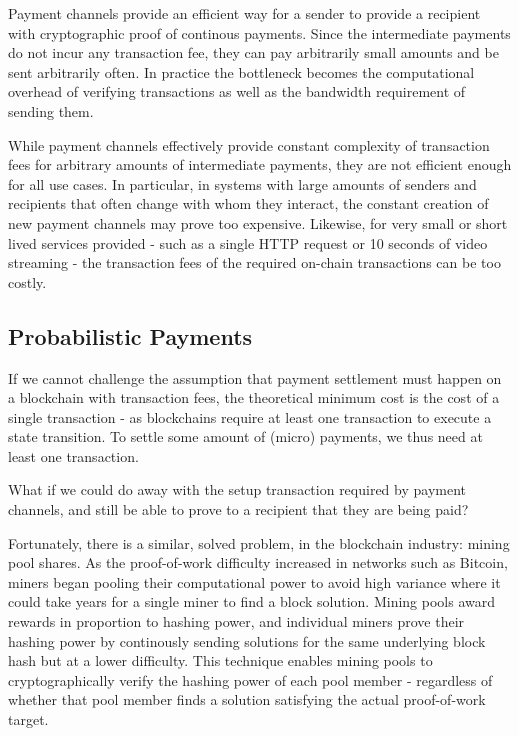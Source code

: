 Payment channels provide an efficient way for a sender to provide a recipient with cryptographic proof of continous payments. Since the intermediate payments do not incur any transaction fee, they can pay arbitrarily small amounts and be sent arbitrarily often. In practice the bottleneck becomes the computational overhead of verifying transactions as well as the bandwidth requirement of sending them.

While payment channels effectively provide constant complexity of transaction fees for arbitrary amounts of intermediate payments, they are not efficient enough for all use cases. In particular, in systems  with large amounts of senders and recipients that often change with whom they interact, the constant creation of new payment channels may prove too expensive. Likewise, for very small or short lived services provided - such as a single HTTP request or 10 seconds of video streaming - the transaction fees of the required on-chain transactions can be too costly.

\subsection{Probabilistic Payments}

If we cannot challenge the assumption that payment settlement must happen on a blockchain with transaction fees, the theoretical minimum cost is the cost of a single transaction - as blockchains require at least one transaction to execute a state transition. To settle some amount of (micro) payments, we thus need at least one transaction.

What if we could do away with the setup transaction required by payment channels, and still be able to prove to a recipient that they are being paid?

Fortunately, there is a similar, solved problem, in the blockchain industry: mining pool shares\cite{MiningPoolMethods}. As the proof-of-work difficulty increased in networks such as Bitcoin, miners began pooling their computational power to avoid high variance where it could take years for a single miner to find a block solution. Mining pools award rewards in proportion to hashing power, and individual miners prove their hashing power by continously sending solutions\cite{MiningPoolShares} for the same underlying block hash but at a lower difficulty. This technique enables mining pools to cryptographically verify the hashing power of each pool member - regardless of whether that pool member finds a solution satisfying the actual proof-of-work target.

